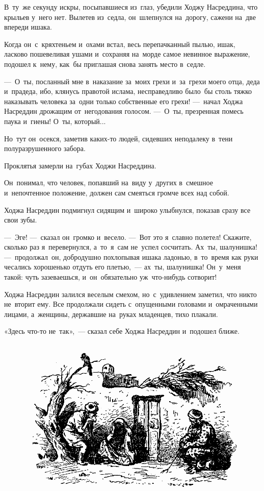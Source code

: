 \documentclass[12pt,a4paper]{book}
\begin{document}
В~ту~же секунду искры, посыпавшиеся из~глаз, убедили Ходжу Насреддина, что крыльев у~него нет. Вылетев из~седла, он~шлепнулся на~дорогу, сажени на~две впереди ишака.

Когда он~с~кряхтеньем и~охами встал, весь перепачканный пылью, ишак, ласково пошевеливая ушами и~сохраняя на~морде самое невинное выражение, подошел к~нему, как~бы приглашая снова занять место в~седле.

—~О~ты, посланный мне в~наказание за~моих грехи и~за~грехи моего отца, деда и~прадеда, ибо, клянусь правотой ислама, несправедливо было~бы столь тяжко наказывать человека за~одни только собственные его грехи! —~начал Ходжа Насреддин дрожащим от~негодования голосом. —~О~ты, презренная помесь паука и~гиены! О~ты, который...

Но~тут он~осекся, заметив каких-то людей, сидевших неподалеку в~тени полуразрушенного забора.

Проклятья замерли на~губах Ходжи Насреддина.

Он~понимал, что человек, попавший на~виду у~других в~смешное и~непочтенное положение, должен сам смеяться громче всех над собой.

Ходжа Насреддин подмигнул сидящим и~широко улыбнулся, показав сразу все свои зубы.

—~Эге! —~сказал он~громко и~весело. —~Вот это я~славно полетел! Скажите, сколько раз я~перевернулся, а~то~я~сам не~успел сосчитать. Ах~ты, шалунишка! —~продолжал~он, добродушно похлопывая ишака ладонью, в~то~время как руки чесались хорошенько отдуть его плетью,~— ах~ты, шалунишка! Он~у~меня такой: чуть зазеваешься, и~он~обязательно уж~что-нибудь сотворит!

Ходжа Насреддин залился веселым смехом, но~с~удивлением заметил, что никто не~вторит ему. Все продолжали сидеть с~опущенными головами и~омраченными лицами, а~женщины, державшие на~руках младенцев, тихо плакали.

«Здесь что-то не~так»,~— сказал себе Ходжа Насреддин и~подошел ближе.

\begin{figure}[h]
\centering
\includegraphics[width=\textwidth]{3.png}
\end{figure}
\end{document}

